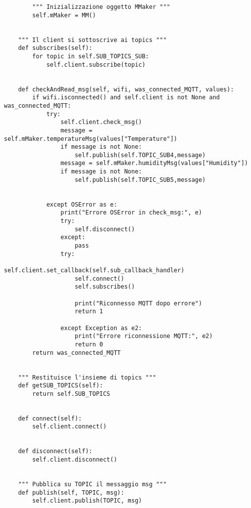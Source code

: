 \documentclass[12pt,a4paper]{article}
\begin{document}
\begin{lstlisting}
		""" Inizializzazione oggetto MMaker """
		self.mMaker = MM()
	
	
	""" Il client si sottoscrive ai topics """
	def subscribes(self):
		for topic in self.SUB_TOPICS_SUB:
			self.client.subscribe(topic)
	
	
	def checkAndRead_msg(self, wifi, was_connected_MQTT, values):
		if wifi.isconnected() and self.client is not None and was_connected_MQTT:
			try:
				self.client.check_msg()
				message = self.mMaker.temperatureMsg(values["Temperature"])
				if message is not None:
					self.publish(self.TOPIC_SUB4,message)
				message = self.mMaker.humidityMsg(values["Humidity"])
				if message is not None:
					self.publish(self.TOPIC_SUB5,message)
		
		
			except OSError as e:
				print("Errore OSError in check_msg:", e)
				try:
					self.disconnect()
				except:
					pass
				try:
					self.client.set_callback(self.sub_callback_handler)
					self.connect()
					self.subscribes()
					
					print("Riconnesso MQTT dopo errore")
					return 1
				
				except Exception as e2:
					print("Errore riconnessione MQTT:", e2)
					return 0     
		return was_connected_MQTT      
	
	
	""" Restituisce l'insieme di topics """
	def getSUB_TOPICS(self):
		return self.SUB_TOPICS
	
	
	def connect(self):
		self.client.connect()
	
	
	def disconnect(self):
		self.client.disconnect()
	
	
	""" Pubblica su TOPIC il messaggio msg """
	def publish(self, TOPIC, msg):
		self.client.publish(TOPIC, msg)	
	
\end{lstlisting}
\end{document}
